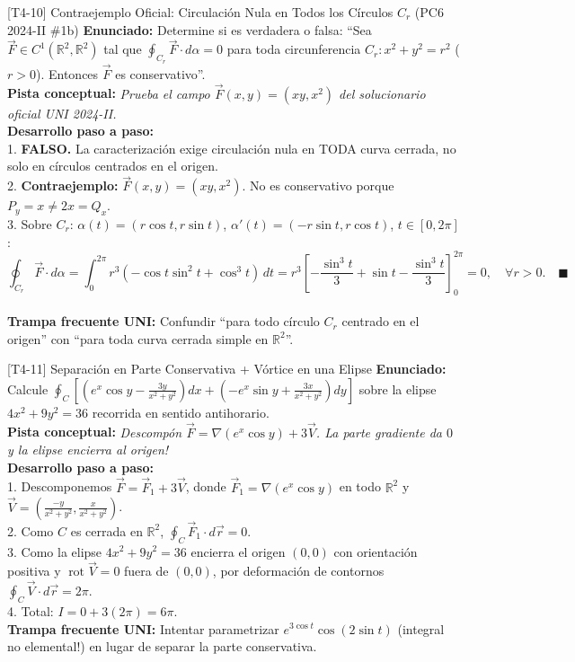 \documentclass[11pt,a4paper]{article}
\begin{document}
\begin{ejerciciobox}{[T4-10] Contraejemplo Oficial: Circulación Nula en Todos los Círculos $C_r$ (PC6 2024-II \#1b)}
\textbf{Enunciado:} Determine si es verdadera o falsa: ``Sea $\vec{F} \in C^1(\mathbb{R}^2, \mathbb{R}^2)$ tal que $\oint_{C_r} \vec{F}\cdot d\alpha = 0$ para toda circunferencia $C_r: x^2+y^2=r^2$ ($r > 0$). Entonces $\vec{F}$ es conservativo''.\\[0.2cm]
\textbf{Pista conceptual:} \emph{Prueba el campo $\vec{F}(x,y) = (xy, x^2)$ del solucionario oficial UNI 2024-II.}\\[0.2cm]
\textbf{Desarrollo paso a paso:}\\
1. \textbf{FALSO.} La caracterización exige circulación nula en TODA curva cerrada, no solo en círculos centrados en el origen.\\
2. \textbf{Contraejemplo:} $\vec{F}(x,y) = (xy, x^2)$. No es conservativo porque $P_y = x \neq 2x = Q_x$.\\
3. Sobre $C_r$: $\alpha(t) = (r\cos t, r\sin t)$, $\alpha'(t) = (-r\sin t, r\cos t)$, $t\in[0,2\pi]$:\\
$$\oint_{C_r} \vec{F}\cdot d\alpha = \int_0^{2\pi} r^3(-\cos t\sin^2 t + \cos^3 t)\,dt = r^3\left[-\frac{\sin^3 t}{3} + \sin t - \frac{\sin^3 t}{3}\right]_0^{2\pi} = 0, \quad \forall r > 0. \quad \blacksquare$$\\[0.2cm]
\textbf{Trampa frecuente UNI:} Confundir ``para todo círculo $C_r$ centrado en el origen'' con ``para toda curva cerrada simple en $\mathbb{R}^2$''.
\end{ejerciciobox}

\begin{ejerciciobox}{[T4-11] Separación en Parte Conservativa + Vórtice en una Elipse}
\textbf{Enunciado:} Calcule $\oint_C \left[\left(e^x\cos y - \frac{3y}{x^2+y^2}\right)dx + \left(-e^x\sin y + \frac{3x}{x^2+y^2}\right)dy\right]$ sobre la elipse $4x^2 + 9y^2 = 36$ recorrida en sentido antihorario.\\[0.2cm]
\textbf{Pista conceptual:} \emph{Descompón $\vec{F} = \nabla(e^x\cos y) + 3\vec{V}$. La parte gradiente da $0$ y la elipse encierra al origen!}\\[0.2cm]
\textbf{Desarrollo paso a paso:}\\
1. Descomponemos $\vec{F} = \vec{F}_1 + 3\vec{V}$, donde $\vec{F}_1 = \nabla(e^x\cos y)$ en todo $\mathbb{R}^2$ y $\vec{V} = \left(\frac{-y}{x^2+y^2}, \frac{x}{x^2+y^2}\right)$.\\
2. Como $C$ es cerrada en $\mathbb{R}^2$, $\oint_C \vec{F}_1\cdot d\vec{r} = 0$.\\
3. Como la elipse $4x^2+9y^2=36$ encierra el origen $(0,0)$ con orientación positiva y $\operatorname{rot}\vec{V} = 0$ fuera de $(0,0)$, por deformación de contornos $\oint_C \vec{V}\cdot d\vec{r} = 2\pi$.\\
4. Total: $I = 0 + 3(2\pi) = 6\pi$.\\[0.2cm]
\textbf{Trampa frecuente UNI:} Intentar parametrizar $e^{3\cos t}\cos(2\sin t)$ (integral no elemental!) en lugar de separar la parte conservativa.
\end{ejerciciobox}
\end{document}
